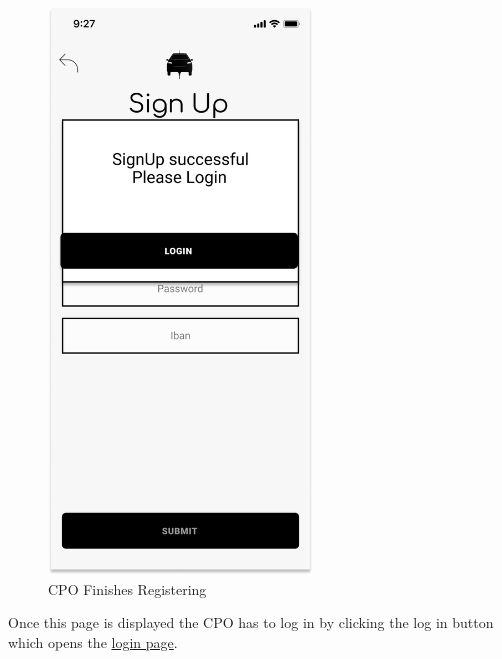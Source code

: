 \begin{figure}[H]
    \centering
    \includegraphics[keepaspectratio, height=15cm]{Mockup/CPOAppInterface/RegisterConfirmation.png}
    \caption{\ac{CPO} Finishes Registering}
    \label{site:ConfirmReg}
\end{figure}
Once this page is displayed the \ac{CPO} has to log in by clicking the log in button which opens the \hyperref[site:Login]{login page}.
